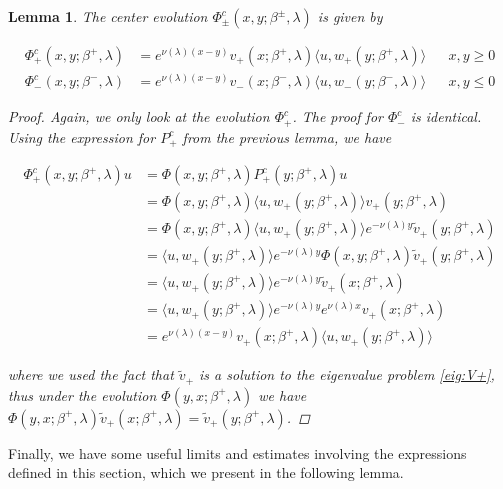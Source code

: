 \documentclass[12pt]{article}
\newtheorem{lemma}{Lemma}
\begin{document}
\begin{lemma}

The center evolution $\Phi^c_\pm(x,y; \beta^\pm, \lambda)$ is given by

\begin{align}\label{Phic}
\Phi^c_+(x,y; \beta^+, \lambda) &= e^{\nu(\lambda)(x-y)} v_+(x; \beta^+, \lambda) \langle u, w_+(y; \beta^+, \lambda) \rangle && x, y \geq 0 \\
\Phi^c_-(x,y; \beta^-, \lambda) &= e^{\nu(\lambda)(x-y)} v_-(x; \beta^-, \lambda) \langle u, w_-(y; \beta^-, \lambda) \rangle && x, y \leq 0
\end{align}

\begin{proof}

Again, we only look at the evolution $\Phi^c_+$. The proof for $\Phi^c_-$ is identical. Using the expression for $P^c_+$ from the previous lemma, we have

\begin{align*}
\Phi^c_+(x,y; \beta^+, \lambda)u &= \Phi(x,y; \beta^+, \lambda) P^c_+(y; \beta^+, \lambda) u \\
&= \Phi(x,y; \beta^+, \lambda) \langle u, w_+(y; \beta^+, \lambda) \rangle v_+(y; \beta^+, \lambda) \\
&= \Phi(x,y; \beta^+, \lambda) \langle u, w_+(y; \beta^+, \lambda) \rangle e^{-\nu(\lambda)y} \tilde{v}_+(y; \beta^+, \lambda) \\
&= \langle u, w_+(y; \beta^+, \lambda) \rangle e^{-\nu(\lambda)y} \Phi(x,y; \beta^+, \lambda) \tilde{v}_+(y; \beta^+, \lambda) \\
&= \langle u, w_+(y; \beta^+, \lambda) \rangle e^{-\nu(\lambda)y} \tilde{v}_+(x; \beta^+, \lambda) \\
&= \langle u, w_+(y; \beta^+, \lambda) \rangle e^{-\nu(\lambda)y} e^{\nu(\lambda)x} v_+(x; \beta^+, \lambda) \\
&= e^{\nu(\lambda)(x-y)} v_+(x; \beta^+, \lambda) \langle u, w_+(y; \beta^+, \lambda) \rangle 
\end{align*}

where we used the fact that $\tilde{v}_+$ is a solution to the eigenvalue problem \eqref{eig:V+}, thus under the evolution $\Phi(y, x; \beta^+, \lambda)$ we have $\Phi(y, x; \beta^+, \lambda)\tilde{v}_+(x; \beta^+, \lambda) = \tilde{v}_+(y; \beta^+, \lambda)$.
\end{proof}
\end{lemma}

Finally, we have some useful limits and estimates involving the expressions defined in this section, which we present in the following lemma.
\end{document}
